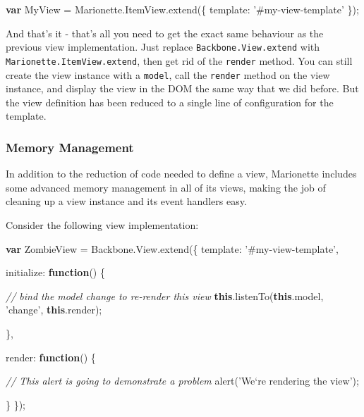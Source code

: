 \documentclass[9pt]{book}
\newenvironment{Shaded}{}{}
\newcommand{\KeywordTok}[1]{\textcolor[rgb]{0.00,0.44,0.13}{\textbf{{#1}}}}
\newcommand{\DataTypeTok}[1]{\textcolor[rgb]{0.56,0.13,0.00}{{#1}}}
\newcommand{\StringTok}[1]{\textcolor[rgb]{0.25,0.44,0.63}{{#1}}}
\newcommand{\CommentTok}[1]{\textcolor[rgb]{0.38,0.63,0.69}{\textit{{#1}}}}
\newcommand{\OtherTok}[1]{\textcolor[rgb]{0.00,0.44,0.13}{{#1}}}
\newcommand{\FunctionTok}[1]{\textcolor[rgb]{0.02,0.16,0.49}{{#1}}}
\newcommand{\NormalTok}[1]{{#1}}
\begin{document}
\begin{Shaded}
\begin{Highlighting}[]
\KeywordTok{var} \NormalTok{MyView = }\OtherTok{Marionette}\NormalTok{.}\OtherTok{ItemView}\NormalTok{.}\FunctionTok{extend}\NormalTok{(\{}
  \DataTypeTok{template}\NormalTok{: }\StringTok{'#my-view-template'}
\NormalTok{\});}
\end{Highlighting}
\end{Shaded}

And that's it - that's all you need to get the exact same behaviour as
the previous view implementation. Just replace
\texttt{Backbone.View.extend} with \texttt{Marionette.ItemView.extend},
then get rid of the \texttt{render} method. You can still create the
view instance with a \texttt{model}, call the \texttt{render} method on
the view instance, and display the view in the DOM the same way that we
did before. But the view definition has been reduced to a single line of
configuration for the template.

\subsubsection{Memory Management}\label{memory-management}

In addition to the reduction of code needed to define a view, Marionette
includes some advanced memory management in all of its views, making the
job of cleaning up a view instance and its event handlers easy.

Consider the following view implementation:

\begin{Shaded}
\begin{Highlighting}[]
\KeywordTok{var} \NormalTok{ZombieView = }\OtherTok{Backbone}\NormalTok{.}\OtherTok{View}\NormalTok{.}\FunctionTok{extend}\NormalTok{(\{}
  \DataTypeTok{template}\NormalTok{: }\StringTok{'#my-view-template'}\NormalTok{,}

  \DataTypeTok{initialize}\NormalTok{: }\KeywordTok{function}\NormalTok{() \{}

    \CommentTok{// bind the model change to re-render this view}
    \KeywordTok{this}\NormalTok{.}\FunctionTok{listenTo}\NormalTok{(}\KeywordTok{this}\NormalTok{.}\FunctionTok{model}\NormalTok{, }\StringTok{'change'}\NormalTok{, }\KeywordTok{this}\NormalTok{.}\FunctionTok{render}\NormalTok{);}

  \NormalTok{\},}

  \DataTypeTok{render}\NormalTok{: }\KeywordTok{function}\NormalTok{() \{}

    \CommentTok{// This alert is going to demonstrate a problem}
    \FunctionTok{alert}\NormalTok{(}\StringTok{'We`re rendering the view'}\NormalTok{);}

  \NormalTok{\}}
\NormalTok{\});}
\end{Highlighting}
\end{Shaded}
\end{document}
